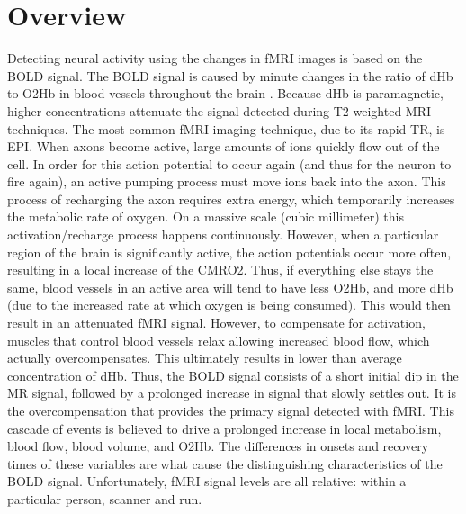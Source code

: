 \section{Overview}
\label{sec:Introduction Overview}
Detecting neural activity using the changes in \ac{fMRI} images is based on 
the \ac{BOLD} signal.
The \ac{BOLD} signal is caused by minute changes in the ratio of 
\ac{dHb} to \ac{O2Hb} in blood vessels throughout the brain \cite{Ogawa}.
Because \ac{dHb} is paramagnetic, higher concentrations
attenuate the signal detected during \ac{T2}-weighted \ac{MRI}
techniques. The most common \ac{fMRI} imaging technique, due to its rapid 
\ac{TR}, is \ac{EPI}. When axons become active,
large amounts of ions quickly flow out of the cell. In order for this
action potential to occur again (and thus for the neuron to fire again),
an active pumping process must move ions back into the
axon. This process of recharging the axon requires extra energy, which temporarily
increases the metabolic rate of oxygen. On a massive scale (cubic millimeter) 
this activation/recharge process happens continuously. However, when a 
particular region of the brain is significantly active, the action potentials
occur more often, resulting in a local increase of the 
\ac{CMRO2}. Thus, if everything else 
stays the same, blood vessels in an active area will 
tend to have less \ac{O2Hb}, and more \ac{dHb}
(due to the increased rate at which oxygen is being consumed).
This would then result in an attenuated \ac{fMRI} signal. However, to
compensate for activation, muscles that
control blood vessels relax allowing increased blood flow,
which actually overcompensates.
This ultimately results in lower than average concentration of 
\ac{dHb}. Thus, the \ac{BOLD} signal consists of a short initial
dip in the \ac{MR} signal, followed by a prolonged increase in signal
that slowly settles out. It is the overcompensation that provides
the  primary signal detected with \ac{fMRI}. This cascade of events
is believed to drive a prolonged increase in local metabolism, 
blood flow, blood volume, and \ac{O2Hb}. The differences
in onsets and recovery times of these variables are what cause the 
distinguishing characteristics of the \ac{BOLD} signal. Unfortunately, 
\ac{fMRI} signal levels are all relative: within a particular
person, scanner and run. 

